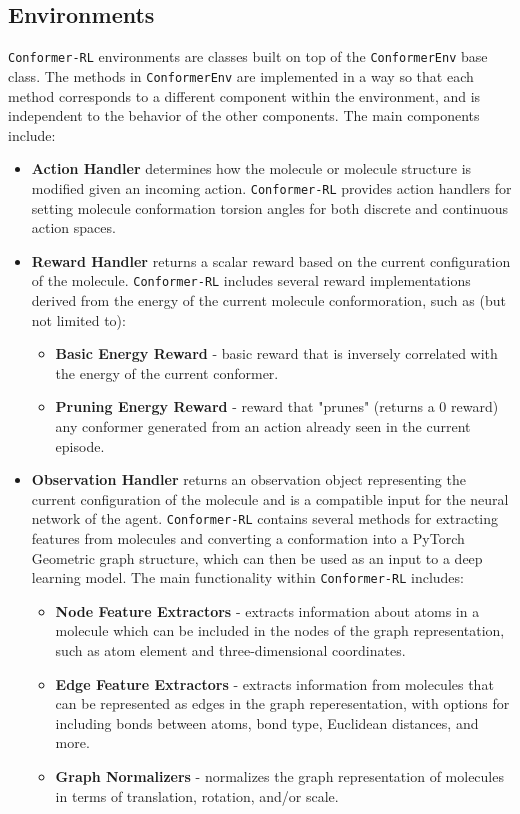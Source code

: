 \documentclass[twoside,11pt]{article}
\newcommand{\code}[1]{\texttt{#1}}
\newcommand{\titleofpaper}{Conformer-RL}
\begin{document}
\subsection{Environments}
\code{\titleofpaper} environments are classes built on top of the \code{ConformerEnv} base class. The methods in \code{ConformerEnv} are implemented in a way so that each method corresponds to a different component within the environment, and is independent to the behavior of the other components. The main components include:
\begin{itemize}
  \item \textbf{Action Handler} determines how the molecule or molecule structure is modified given an incoming action. \code{\titleofpaper} provides action handlers for setting molecule conformation torsion angles for both discrete and continuous action spaces.
  
  \item \textbf{Reward Handler} returns a scalar reward based on the current configuration of the molecule. \code{\titleofpaper} includes several reward implementations derived from the energy of the current molecule conformoration, such as (but not limited to):
  \begin{itemize}
    \item \textbf{Basic Energy Reward} - basic reward that is inversely correlated with the energy of the current conformer.
    \item \textbf{Pruning Energy Reward} - reward that "prunes" (returns a 0 reward) any conformer generated from an action already seen in the current episode.
  \end{itemize}

  \item \textbf{Observation Handler} returns an observation object representing the current configuration of the molecule and is a compatible input for the neural network of the agent. \code{\titleofpaper} contains several methods for extracting features from molecules and converting a conformation into a PyTorch Geometric graph structure, which can then be used as an input to a deep learning model. The main functionality within \code{\titleofpaper} includes:
  \begin{itemize}
    \item \textbf{Node Feature Extractors} - extracts information about atoms in a molecule which can be included in the nodes of the graph representation, such as atom element and three-dimensional coordinates.
    \item \textbf{Edge Feature Extractors} - extracts information from molecules that can be represented as edges in the graph reperesentation, with options for including bonds between atoms, bond type, Euclidean distances, and more.
    \item \textbf{Graph Normalizers} - normalizes the graph representation of molecules in terms of translation, rotation, and/or scale.
  \end{itemize}


\end{itemize}
\end{document}
